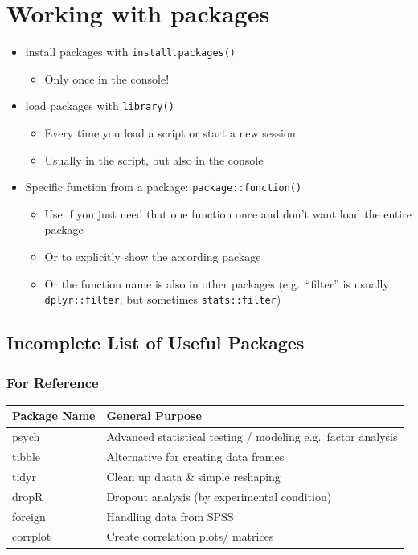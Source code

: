 \documentclass[
]{book}
\providecommand{\tightlist}{%
  \setlength{\itemsep}{0pt}\setlength{\parskip}{0pt}}
\begin{document}
\section{\texorpdfstring{Working with packages }{Working with packages }}\label{working-with-packages}

\begin{itemize}
\tightlist
\item
  install packages with \texttt{install.packages()}

  \begin{itemize}
  \tightlist
  \item
    Only once in the console!
  \end{itemize}
\item
  load packages with \texttt{library()}

  \begin{itemize}
  \tightlist
  \item
    Every time you load a script or start a new session
  \item
    Usually in the script, but also in the console
  \end{itemize}
\item
  Specific function from a package: \texttt{package::function()}

  \begin{itemize}
  \tightlist
  \item
    Use if you just need that one function once and don't want load the entire package
  \item
    Or to explicitly show the according package
  \item
    Or the function name is also in other packages (e.g.~``filter'' is usually \texttt{dplyr::filter}, but sometimes \texttt{stats::filter})
  \end{itemize}
\end{itemize}

\subsection{Incomplete List of Useful Packages}\label{incomplete-list-of-useful-packages}

\subsubsection{For Reference}\label{for-reference}

\begin{longtable}[]{@{}ll@{}}
\toprule\noalign{}
Package Name & General Purpose \\
\midrule\noalign{}
\endhead
\bottomrule\noalign{}
\endlastfoot
psych & Advanced statistical testing / modeling e.g.~factor analysis \\
tibble & Alternative for creating data frames \\
tidyr & Clean up daata \& simple reshaping \\
dropR & Dropout analysis (by experimental condition) \\
foreign & Handling data from SPSS \\
corrplot & Create correlation plots/ matrices \\
\end{longtable}
\end{document}
